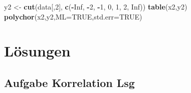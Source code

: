 \documentclass[
]{article}
\newenvironment{Shaded}{\begin{snugshade}}{\end{snugshade}}
\newcommand{\AttributeTok}[1]{\textcolor[rgb]{0.13,0.29,0.53}{#1}}
\newcommand{\ConstantTok}[1]{\textcolor[rgb]{0.56,0.35,0.01}{#1}}
\newcommand{\DecValTok}[1]{\textcolor[rgb]{0.00,0.00,0.81}{#1}}
\newcommand{\FunctionTok}[1]{\textcolor[rgb]{0.13,0.29,0.53}{\textbf{#1}}}
\newcommand{\NormalTok}[1]{#1}
\newcommand{\OtherTok}[1]{\textcolor[rgb]{0.56,0.35,0.01}{#1}}
\newcommand{\SpecialCharTok}[1]{\textcolor[rgb]{0.81,0.36,0.00}{\textbf{#1}}}
\begin{document}
\begin{Shaded}
\begin{Highlighting}[]
\NormalTok{    y2 }\OtherTok{\textless{}{-}} \FunctionTok{cut}\NormalTok{(data[,}\DecValTok{2}\NormalTok{], }\FunctionTok{c}\NormalTok{(}\SpecialCharTok{{-}}\ConstantTok{Inf}\NormalTok{, }\SpecialCharTok{{-}}\DecValTok{2}\NormalTok{, }\SpecialCharTok{{-}}\DecValTok{1}\NormalTok{, }\DecValTok{0}\NormalTok{, }\DecValTok{1}\NormalTok{, }\DecValTok{2}\NormalTok{, }\ConstantTok{Inf}\NormalTok{))}
    \FunctionTok{table}\NormalTok{(x2,y2)    }
    \FunctionTok{polychor}\NormalTok{(x2,y2,}\AttributeTok{ML=}\ConstantTok{TRUE}\NormalTok{,}\AttributeTok{std.err=}\ConstantTok{TRUE}\NormalTok{)}
\end{Highlighting}
\end{Shaded}

\section*{Lösungen}\label{luxf6sungen}

\subsection*{Aufgabe Korrelation Lsg}\label{aufgabe-korrelation-lsg}
\end{document}
